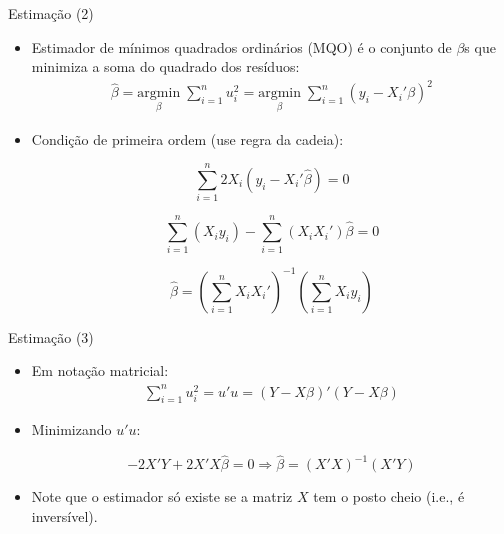\documentclass[10pt,slides,xcolor=pdftex,dvipsnames,table]{beamer}
\begin{document}
\begin{frame}{Estimação (2)}
    
     \begin{itemize}\itemsep1.2em           

     \item Estimador de mínimos quadrados ordinários (MQO) é o conjunto de $\beta$s que minimiza a soma do quadrado dos resíduos:
   \begin{align*}
\hat{\beta} = \underset{\beta}{\mathrm{argmin}} \; \sum_{i=1}^n u_i^2 = \underset{\beta}{\mathrm{argmin}} \; \sum_{i=1}^n (y_i-X_i'\beta)^2  
\end{align*}

     \item Condição de primeira ordem (use regra da cadeia):
     
     $$ \sum_{i=1}^n 2 X_i (y_i-X_i'\hat{\beta}) = 0 $$
     
     $$ \sum_{i=1}^n ( X_i y_i) - \sum_{i=1}^n ( X_i X_i' ) \hat{\beta} = 0 $$
     
     $$ \hat{\beta} = \left( \sum_{i=1}^n X_i X_i' \right)^{-1} \left( \sum_{i=1}^n  X_i y_i \right) $$
     
    \end{itemize}
    
\end{frame}


\begin{frame}{Estimação (3)}
    
     \begin{itemize}\itemsep1.2em           

     \item Em notação matricial:
   \begin{align*}
\sum_{i=1}^n u_i^2 = u'u = (Y-X\beta)'(Y-X\beta)
\end{align*}

     \item Minimizando $u'u$:     

$$ - 2 X' Y + 2 X'X \hat{\beta} = 0 \Longrightarrow \hat{\beta} = (X'X)^{-1} (X'Y) $$
    
	\item Note que o estimador só existe se a matriz $X$ tem o posto cheio (i.e., é inversível).    
     
    \end{itemize}
    
\end{frame}
\end{document}
